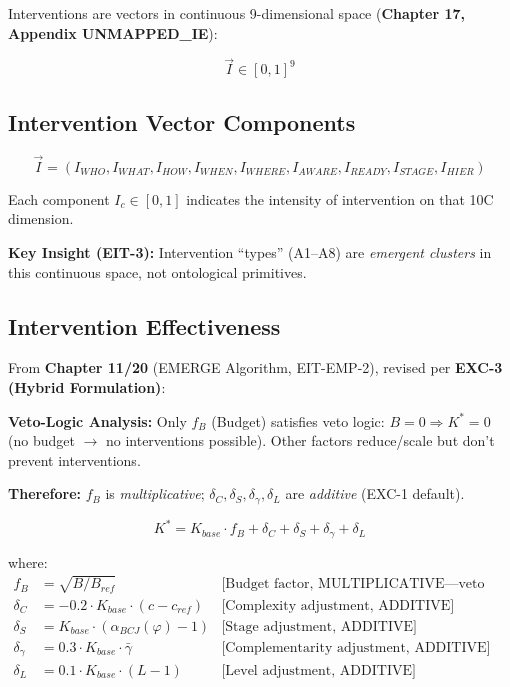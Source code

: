 Interventions are vectors in continuous 9-dimensional space (\textbf{Chapter 17, Appendix UNMAPPED_IE}):

\begin{equation}
\boxed{
\vec{I} \in [0,1]^9
}
\label{eq:mp-intervention}
\end{equation}

\subsection{Intervention Vector Components}

\begin{equation}
\vec{I} = (I_{WHO}, I_{WHAT}, I_{HOW}, I_{WHEN}, I_{WHERE}, I_{AWARE}, I_{READY}, I_{STAGE}, I_{HIER})
\end{equation}

Each component $I_c \in [0,1]$ indicates the intensity of intervention on that 10C dimension.

\textbf{Key Insight (EIT-3):} Intervention ``types'' (A1--A8) are \textit{emergent clusters}
in this continuous space, not ontological primitives.

\subsection{Intervention Effectiveness}

From \textbf{Chapter 11/20} (EMERGE Algorithm, EIT-EMP-2), revised per \textbf{EXC-3 (Hybrid Formulation)}:

\begin{tcolorbox}[colback=green!5!white, colframe=green!75!black,
    title=\textbf{EXC-3 Compliance: K* Hybrid Formula}]
\textbf{Veto-Logic Analysis:} Only $f_B$ (Budget) satisfies veto logic: $B=0 \Rightarrow K^*=0$ (no budget $\to$ no interventions possible). Other factors reduce/scale but don't prevent interventions.

\textbf{Therefore:} $f_B$ is \textit{multiplicative}; $\delta_C, \delta_S, \delta_\gamma, \delta_L$ are \textit{additive} (EXC-1 default).
\end{tcolorbox}

\begin{equation}
\boxed{
K^* = K_{base} \cdot f_B + \delta_C + \delta_S + \delta_\gamma + \delta_L
}
\label{eq:mp-kstar-formula}
\end{equation}

where:
\begin{align}
f_B &= \sqrt{B/B_{ref}} & \text{[Budget factor, MULTIPLICATIVE---veto logic]} \\
\delta_C &= -0.2 \cdot K_{base} \cdot (c - c_{ref}) & \text{[Complexity adjustment, ADDITIVE]} \\
\delta_S &= K_{base} \cdot (\alpha_{BCJ}(\varphi) - 1) & \text{[Stage adjustment, ADDITIVE]} \\
\delta_\gamma &= 0.3 \cdot K_{base} \cdot \bar{\gamma} & \text{[Complementarity adjustment, ADDITIVE]} \\
\delta_L &= 0.1 \cdot K_{base} \cdot (L - 1) & \text{[Level adjustment, ADDITIVE]}
\end{align}

